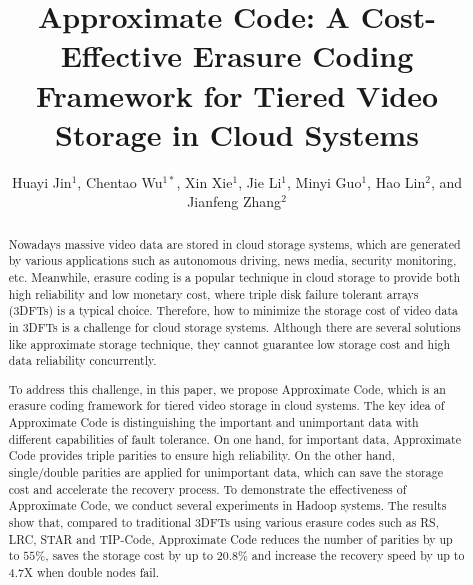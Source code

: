 \documentclass[sigconf]{acmart}
\begin{document}
\title{Approximate Code: A Cost-Effective Erasure Coding Framework for Tiered Video Storage in Cloud Systems}

\author{Huayi Jin$^1$,
        Chentao Wu$^{1*}$,
        Xin Xie$^1$,
        Jie Li$^1$,
        Minyi Guo$^1$,
        Hao Lin$^2$,
        and Jianfeng Zhang$^2$}

\renewcommand{\shortauthors}{Huayi Jin and Chentao Wu, et al.}

\begin{abstract}
Nowadays massive video data are stored in cloud storage systems, which are generated by various applications such as autonomous driving, news media, security monitoring, etc. Meanwhile, erasure coding is a popular technique in cloud storage to provide both high reliability and low monetary cost, where triple disk failure tolerant arrays (3DFTs) is a typical choice. Therefore, how to minimize the storage cost of video data in 3DFTs is a challenge for cloud storage systems. Although there are several solutions like approximate storage technique, they cannot guarantee low storage cost and high data reliability concurrently.

To address this challenge, in this paper, we propose Approximate Code, which is an erasure coding framework for tiered video storage in cloud systems. The key idea of Approximate Code is distinguishing the important and unimportant data with different capabilities of fault tolerance. On one hand, for important data, Approximate Code provides triple parities to ensure high reliability. On the other hand, single/double parities are applied for unimportant data, which can save the storage cost and accelerate the recovery process. To demonstrate the effectiveness of Approximate Code, we conduct several experiments in Hadoop systems. The results show that, compared to traditional 3DFTs using various erasure codes such as RS, LRC, STAR and TIP-Code, Approximate Code reduces the number of parities by up to $55\%$, saves the storage cost by up to $20.8\%$ and increase the recovery speed by up to $4.7$X when double nodes fail.
\end{abstract}

\end{document}
